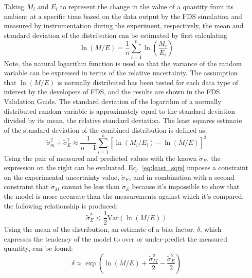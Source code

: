 Taking $M_i$ and $E_i$ to represent the change in the value of a quantity from its ambient at a specific time based on the data output by the FDS simulation and measured by instrumentation during the experiment, respectively, the mean and standard deviation of the distribution can be estimated by first calculating
\begin{equation} 
	\overline{\ln(M/E)}=\frac{1}{n} \sum_{i=1}^n \ln\left( \frac{M_i}{E_i} \right)
\end{equation}
Note, the natural logarithm function is used so that the variance of the random variable can be expressed in terms of the relative uncertainty. The assumption that $\ln(M/E)$ is normally distributed has been tested for each data type of interest by the developers of FDS, and the results are shown in the FDS Validation Guide. The standard deviation of the logarithm of a normally distributed random variable is approximately equal to the standard deviation divided by its mean, the relative standard deviation. The least squares estimate of the standard deviation of the combined distribution is defined as:
\begin{equation}
\label{eq:least_sqrs}
	\widetilde{\sigma}_m^2 + \widetilde{\sigma}_E^2 \approx \frac{1}{n-1}\sum_{i=1}^n \left[ \ln(M_i/E_i) - \overline{\ln(M/E)} \right]^2
\end{equation}
Using the pair of measured and predicted values with the known $\widetilde{\sigma}_E$, the expression on the right can be evaluated. Eq.~\ref{eq:least_sqrs} imposes a constraint on the experimental uncertainty value, $\widetilde{\sigma}_E$, and in combination with a second constraint that $\widetilde{\sigma}_M$ cannot be less than $\widetilde{\sigma}_E$ because it's impossible to show that the model is more accurate than the measurements against which it's compared, the following relationship is produced:
\begin{equation}
	\widetilde{\sigma}_E^2 \leq \frac{1}{2}\textrm{Var}(\ln(M/E))
\end{equation}
Using the mean of the distribution, an estimate of a bias factor, $\delta$, which expresses the tendency of the model to over or under-predict the measured quantity, can be found:
\begin{equation}
	\delta \approx \exp\left( \overline{\ln(M/E)}+\frac{\widetilde{\sigma}_M^2}{2}-\frac{\widetilde{\sigma}_E^2}{2} \right)
\end{equation}


